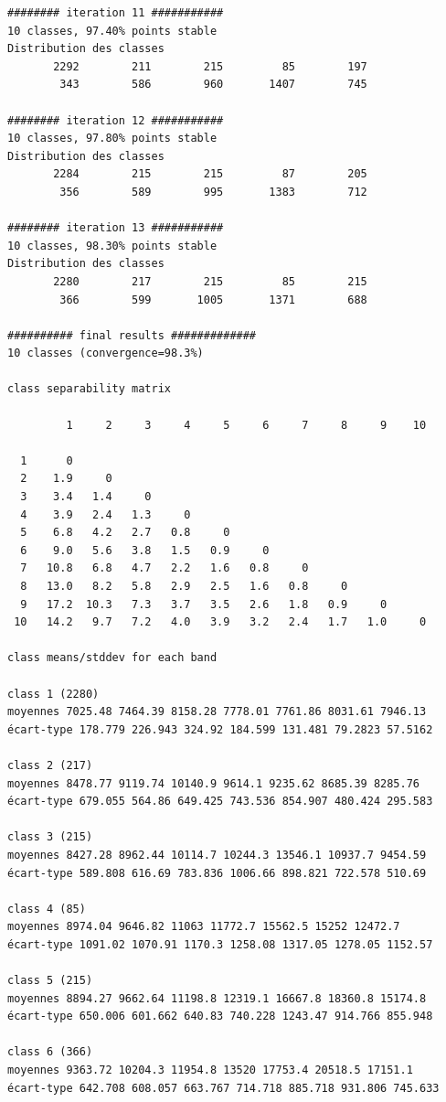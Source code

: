 \documentclass[earth,article,accept,pdftex,moreauthors]{Definitions/mdpi}
\begin{document}
{\begin{scriptsize}
\begin{verbatim}
######## iteration 11 ###########
10 classes, 97.40% points stable
Distribution des classes
       2292        211        215         85        197
        343        586        960       1407        745

######## iteration 12 ###########
10 classes, 97.80% points stable
Distribution des classes
       2284        215        215         87        205
        356        589        995       1383        712

######## iteration 13 ###########
10 classes, 98.30% points stable
Distribution des classes
       2280        217        215         85        215
        366        599       1005       1371        688

########## final results #############
10 classes (convergence=98.3%)

class separability matrix

         1     2     3     4     5     6     7     8     9    10

  1      0
  2    1.9     0
  3    3.4   1.4     0
  4    3.9   2.4   1.3     0
  5    6.8   4.2   2.7   0.8     0
  6    9.0   5.6   3.8   1.5   0.9     0
  7   10.8   6.8   4.7   2.2   1.6   0.8     0
  8   13.0   8.2   5.8   2.9   2.5   1.6   0.8     0
  9   17.2  10.3   7.3   3.7   3.5   2.6   1.8   0.9     0
 10   14.2   9.7   7.2   4.0   3.9   3.2   2.4   1.7   1.0     0

class means/stddev for each band

class 1 (2280)
moyennes 7025.48 7464.39 8158.28 7778.01 7761.86 8031.61 7946.13
écart-type 178.779 226.943 324.92 184.599 131.481 79.2823 57.5162

class 2 (217)
moyennes 8478.77 9119.74 10140.9 9614.1 9235.62 8685.39 8285.76
écart-type 679.055 564.86 649.425 743.536 854.907 480.424 295.583

class 3 (215)
moyennes 8427.28 8962.44 10114.7 10244.3 13546.1 10937.7 9454.59
écart-type 589.808 616.69 783.836 1006.66 898.821 722.578 510.69

class 4 (85)
moyennes 8974.04 9646.82 11063 11772.7 15562.5 15252 12472.7
écart-type 1091.02 1070.91 1170.3 1258.08 1317.05 1278.05 1152.57

class 5 (215)
moyennes 8894.27 9662.64 11198.8 12319.1 16667.8 18360.8 15174.8
écart-type 650.006 601.662 640.83 740.228 1243.47 914.766 855.948

class 6 (366)
moyennes 9363.72 10204.3 11954.8 13520 17753.4 20518.5 17151.1
écart-type 642.708 608.057 663.767 714.718 885.718 931.806 745.633


\end{verbatim}
\end{scriptsize}}
\end{document}
